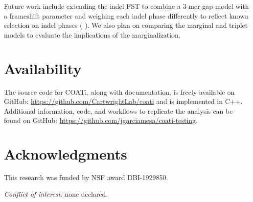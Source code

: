 \documentclass[12pt,letterpaper]{article}
\renewcommand{\cite}[1]{\citeauthor{#1} \citeyear{#1}}
\newcommand{\citembe}[1]{(\cite{#1})}
\providecommand{\DIFdelbegin}{} %
\providecommand{\DIFdelend}{} %
\newcommand{\DIFscaledelfig}{0.5}
\newlength{\DIFdelgraphicswidth} %
\newlength{\DIFdelgraphicsheight} %
\newcommand{\DIFdelincludegraphics}[2][]{%
\sbox{\DIFdelgraphicsbox}{\DIFOincludegraphics[#1]{#2}}%
\settoboxwidth{\DIFdelgraphicswidth}{\DIFdelgraphicsbox} %
\settoboxtotalheight{\DIFdelgraphicsheight}{\DIFdelgraphicsbox} %
\scalebox{\DIFscaledelfig}{%
\parbox[b]{\DIFdelgraphicswidth}{\usebox{\DIFdelgraphicsbox}\\[-\baselineskip] \rule{\DIFdelgraphicswidth}{0em}}\llap{\resizebox{\DIFdelgraphicswidth}{\DIFdelgraphicsheight}{%
\setlength{\unitlength}{\DIFdelgraphicswidth}%
\begin{picture}(1,1)%
\thicklines\linethickness{2pt} %
{\color[rgb]{1,0,0}\put(0,0){\framebox(1,1){}}}%
{\color[rgb]{1,0,0}\put(0,0){\line( 1,1){1}}}%
{\color[rgb]{1,0,0}\put(0,1){\line(1,-1){1}}}%
\end{picture}%
}\hspace*{3pt}}} %
} %
\DeclareRobustCommand{\DIFdelbegin}{\DIFOdelbegin \let\includegraphics\DIFdelincludegraphics} %
\DeclareRobustCommand{\DIFdelend}{\DIFOaddend \let\includegraphics\DIFOincludegraphics} %
\begin{document}
Future work include extending the indel FST to combine a 3-mer gap model with a frameshift parameter and weighing each indel phase differently to reflect known selection on indel phases \citembe{zhu2022profiling}.
We also plan on comparing the marginal and triplet models to evaluate the implications of the marginalization.
\DIFdelbegin %

\DIFdelend 


\section*{Availability}
The source code for COATi, along with documentation, is freely available on GitHub: \url{https://github.com/CartwrightLab/coati} and is implemented in C++. Additional information, code, and workflows to replicate the analysis can be found on GitHub: \url{https://github.com/jgarciamesa/coati-testing}.


\section*{Acknowledgments}

This research was funded by NSF award DBI-1929850.

\noindent \textit{Conflict of interest:} none declared.

%
\setlength{\bibhang}{0pt}


\nolinenumbers
\end{document}
